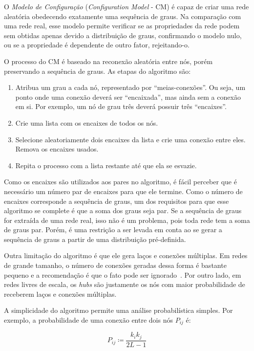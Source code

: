 \documentclass[12pt,a4paper]{article}
\theoremstyle{hypo}
\newcommand{\defn}{\coloneqq} %
\begin{document}
O \textit{Modelo de Configuração} (\textit{Configuration Model} - CM) é capaz de criar uma rede aleatória obedecendo exatamente uma sequência de graus. Na comparação com uma rede real, esse modelo permite verificar se as propriedades da rede podem sem obtidas apenas devido a distribuição de graus, confirmando o modelo nulo, ou se a propriedade é dependente de outro fator, rejeitando-o.

O processo do CM é baseado na reconexão aleatória entre nós, porém preservando a sequência de graus. As etapas do algoritmo são:

\begin{enumerate}
\item Atribua um grau a cada nó, representado por \enquote{meias-conexões}. Ou seja, um ponto onde uma conexão deverá ser \enquote{encaixada}, mas ainda sem a conexão em si. Por exemplo, um nó de grau três deverá possuir três \enquote{encaixes}.
\item Crie uma lista com os encaixes de todos os nós.
\item Selecione aleatoriamente dois encaixes da lista e crie uma conexão entre eles. Remova os encaixes usados.
\item Repita o processo com a lista restante até que ela se esvazie.
\end{enumerate}

Como os encaixes são utilizados aos pares no algoritmo, é fácil perceber que é necessário um número par de encaixes para que ele termine. Como o número de encaixes corresponde a sequência de graus, um dos requisitos para que esse algoritmo se complete é que a soma dos graus seja par. Se a sequência de graus for extraída de uma rede real, isso não é um problema, pois toda rede tem a soma de graus par. Porém, é uma restrição a ser levada em conta ao se gerar a sequência de graus a partir de uma distribuição pré-definida.

Outra limitação do algoritmo é que ele gera laços e conexões múltiplas. Em redes de grande tamanho, o número de conexões geradas dessa forma é bastante pequeno e a recomendação é que o fato pode ser ignorado~\cite{Barabasi2016-rn}. Por outro lado, em redes livres de escala, os \textit{hubs} são justamente os nós com maior probabilidade de receberem laços e conexões múltiplas.

A simplicidade do algoritmo permite uma análise probabilística simples. Por exemplo, a probabilidade de uma conexão entre dois nós $P_{ij}$ é:

\begin{equation} \label{eq:probabilidade-conexao}
P_{ij} \defn \frac{k_i k_j}{2L - 1}
\end{equation}
\end{document}
